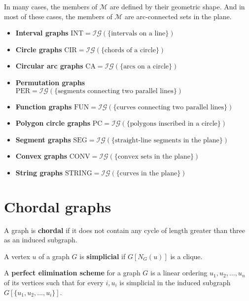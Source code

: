 In many cases, the members of $\mathcal{M}$ are defined by their geometric shape. And in most of these cases, the members of $\mathcal{M}$ are arc-connected sets in the plane.

\begin{itemize}
	\item \textbf{Interval graphs} $\text{INT} = \mathcal{IG}(\{\text{intervals on a line}\})$
	\item \textbf{Circle graphs} $\text{CIR} = \mathcal{IG}(\{\text{chords of a circle}\})$
	\item \textbf{Circular arc graphs} $\text{CA} = \mathcal{IG}(\{\text{arcs on a circle}\})$
	\item \textbf{Permutation graphs} $\text{PER} = \mathcal{IG}(\{\text{segments connecting two parallel lines}\})$
	\item \textbf{Function graphs} $\text{FUN} = \mathcal{IG}(\{\text{curves connecting two parallel lines}\})$
	\item \textbf{Polygon circle graphs} $\text{PC} = \mathcal{IG}(\{\text{polygons inscribed in a circle}\})$
	\item \textbf{Segment graphs} $\text{SEG} = \mathcal{IG}(\{\text{straight-line segments in the plane}\})$
	\item \textbf{Convex graphs} $\text{CONV} = \mathcal{IG}(\{\text{convex sets in the plane}\})$
	\item \textbf{String graphs} $\text{STRING} = \mathcal{IG}(\{\text{curves in the plane}\})$
\end{itemize}

\section{Chordal graphs}

\begin{defn}
	A graph is \textbf{chordal} if it does not contain any cycle of length greater than three as an induced subgraph.
\end{defn}

\begin{defn}
	A vertex $u$ of a graph $G$ is \textbf{simplicial} if $G[N_G(u)]$ is a clique.
\end{defn}

\begin{defn}[PES]
	A \textbf{perfect elimination scheme} for a graph $G$ is a linear ordering $u_1, u_2, \dots, u_n$ of its vertices such that for every $i, u_i$ is simplicial in the induced subgraph $G[\{u_1, u_2, \dots, u_i\}]$.
\end{defn}

